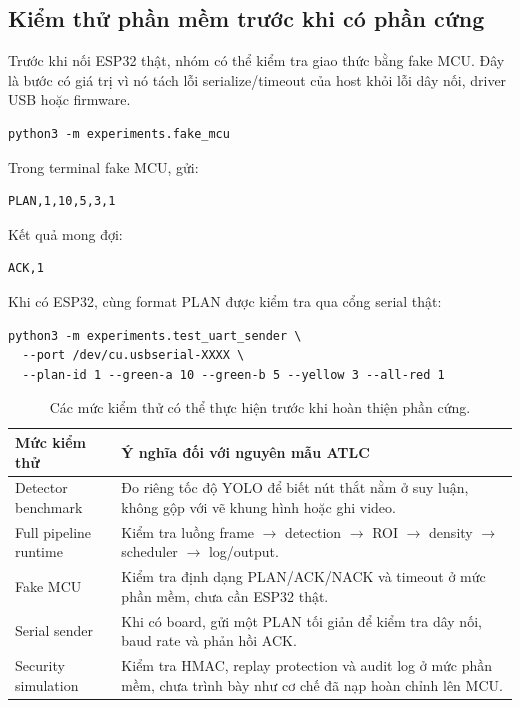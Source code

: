 \subsection{Kiểm thử phần mềm trước khi có phần cứng}

Trước khi nối ESP32 thật, nhóm có thể kiểm tra giao thức bằng fake MCU. Đây là bước có giá trị vì nó tách lỗi serialize/timeout của host khỏi lỗi dây nối, driver USB hoặc firmware.

\begin{lstlisting}
python3 -m experiments.fake_mcu
\end{lstlisting}

Trong terminal fake MCU, gửi:

\begin{lstlisting}
PLAN,1,10,5,3,1
\end{lstlisting}

Kết quả mong đợi:

\begin{lstlisting}
ACK,1
\end{lstlisting}

Khi có ESP32, cùng format PLAN được kiểm tra qua cổng serial thật:

\begin{lstlisting}
python3 -m experiments.test_uart_sender \
  --port /dev/cu.usbserial-XXXX \
  --plan-id 1 --green-a 10 --green-b 5 --yellow 3 --all-red 1
\end{lstlisting}

\begin{table}[H]
\centering
\caption{Các mức kiểm thử có thể thực hiện trước khi hoàn thiện phần cứng.}
\label{tab:appendix-software-tests}
\footnotesize
\setlength{\tabcolsep}{4pt}
\renewcommand{\arraystretch}{1.18}
\begin{tabularx}{\linewidth}{R{3.2cm}Y}
\toprule
\textbf{Mức kiểm thử} & \textbf{Ý nghĩa đối với nguyên mẫu ATLC} \\
\midrule
Detector benchmark & Đo riêng tốc độ YOLO để biết nút thắt nằm ở suy luận, không gộp với vẽ khung hình hoặc ghi video. \\
Full pipeline runtime & Kiểm tra luồng frame \(\rightarrow\) detection \(\rightarrow\) ROI \(\rightarrow\) density \(\rightarrow\) scheduler \(\rightarrow\) log/output. \\
Fake MCU & Kiểm tra định dạng PLAN/ACK/NACK và timeout ở mức phần mềm, chưa cần ESP32 thật. \\
Serial sender & Khi có board, gửi một PLAN tối giản để kiểm tra dây nối, baud rate và phản hồi ACK. \\
Security simulation & Kiểm tra HMAC, replay protection và audit log ở mức phần mềm, chưa trình bày như cơ chế đã nạp hoàn chỉnh lên MCU. \\
\bottomrule
\end{tabularx}
\normalsize
\end{table}

